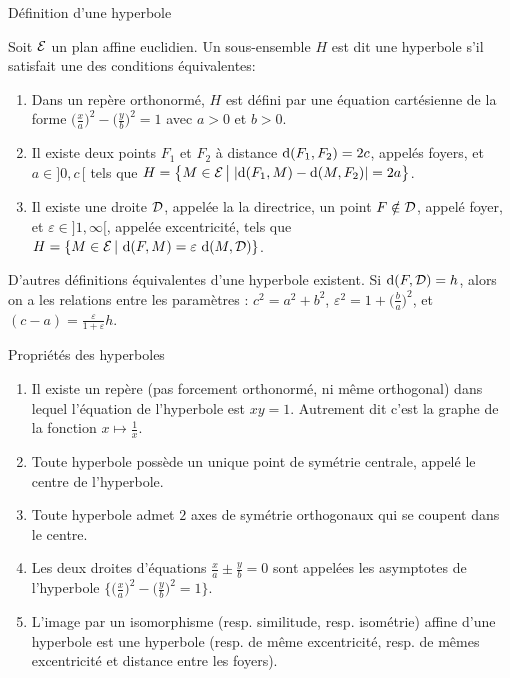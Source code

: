\documentclass[11pt]{m53beamer}
\begin{document}
\begin{frame}{Définition d'une hyperbole}
  \begin{defprop}
    Soit $\mathcal{E}$ un plan affine euclidien. Un sous-ensemble $H$ est dit une \alert{hyperbole} s'il satisfait une des conditions équivalentes:
    \begin{enumerate}[<+(1)->]
      \item Dans un repère orthonormé, $H$ est défini par une équation cartésienne de la forme $\big(\frac{x}{a}\big)^{2}-\big(\frac{y}{b}\big)^{2}=1$ avec $a>0$ et $b>0$.
      \item Il existe deux points $F_{1}$ et $F_{2}$ à distance $\operatorname{d}(F_{1},F_{2})=2c$, appelés \alert{foyers},  et $a \in ]0,c\,[$ tels que $H = \big\{ M \in \mathcal{E} \,\big|\; |\!\operatorname{d}(F_{1},M)-\operatorname{d}(M,F_{2})|=2a\big\}$.
      \item Il existe une droite $\mathcal{D}$, appelée la \alert{la directrice}, un point $F \notin \mathcal{D}$, appelé \alert{foyer}, et $\varepsilon \in ]1,\infty[$, appelée \alert{excentricité}, tels que $H = \{ M \in \mathcal{E} \,|\, \operatorname{d}(F,M)=\varepsilon\,\operatorname{d}(M,\mathcal{D})\}$.
    \end{enumerate}
  \end{defprop}\pause
  D'autres définitions équivalentes d'une hyperbole existent.\pause{}\newline
  Si $\operatorname{d}(F,\mathcal{D})=h$, alors on a les relations entre les paramètres : $c^{2}=a^{2}+b^{2}$, $\varepsilon^{2} =1+\big(\frac{b}{a}\big)^{2}$, et $(c-a)=\frac{\varepsilon}{1+\varepsilon}h$.
\end{frame}
\begin{frame}{Propriétés des hyperboles}
  \begin{enumerate}[<+(1)->]
    \item Il existe un repère (pas forcement orthonormé, ni même orthogonal) dans lequel l'équation de l'hyperbole est $xy=1$. Autrement dit c'est la graphe de la fonction $x\mapsto\frac{1}{x}$.
    \item Toute hyperbole possède un unique point de symétrie centrale, appelé \alert{le centre} de l'hyperbole.
    \item Toute hyperbole admet $2$ axes de symétrie orthogonaux qui se coupent dans le centre.
    \item Les deux droites d'équations $\frac{x}{a}\pm\frac{y}{b}=0$ sont appelées \alert{les asymptotes} de l'hyperbole $\big\{\big(\frac{x}{a}\big)^{2}-\big(\frac{y}{b}\big)^{2}=1\big\}$.
    \item L'image par un isomorphisme (resp. similitude, resp. isométrie) affine d'une hyperbole est une hyperbole (resp. de même excentricité, resp. de mêmes excentricité et distance entre les foyers).
  \end{enumerate}
\end{frame}
\end{document}
